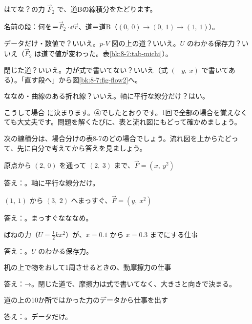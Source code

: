 はてな？の力 $\vec F_2$ で、道Bの線積分をたどります。
\begin{enumerate}[label={\bkcircled[\bkTT]{\arabic*}}, leftmargin=2.4\zw, itemsep=1pt, topsep=2pt]
\item 名前の段：何を＝$\vec F_2\cdot\dd\vec r$、道＝道B（$(0,\ 0)\to(0,\ 1)\to(1,\ 1)$）。
\item データだけ・数値で？\enspace いいえ。\enspace $p$-$V$ 図の上の道？\enspace いいえ。\enspace $U$ のわかる保存力？\enspace いいえ（$\vec F_2$ は道で値が変わった。表\ref{bk:8-7:tab-michi}）。
\item 閉じた道？\enspace いいえ。\enspace 力が式で書いてない？\enspace いいえ（式 $(-y,\ x)$ で書いてある）。\enspace 「直す段へ」から図\ref{bk:8-7:fig-flow2}へ。
\item ななめ・曲線のある折れ線？\enspace いいえ。\enspace 軸に平行な線分だけ？\enspace はい。
\end{enumerate}
こうして場合  に決まります。④でしたとおりです。1回で全部の場合を覚えなくても大丈夫です。問題を解くたびに、表と流れ図にもどって確かめましょう。

次の線積分は、場合分けの表8-7のどの場合でしょう。流れ図を上からたどって、先に自分で考えてから答えを見ましょう。
\begin{enumerate}[label={\bkcircled[\bkTT]{\arabic*}}, leftmargin=2.4\zw, itemsep=3pt, topsep=2pt]
\item 原点から $(2,\ 0)$ を通って $(2,\ 3)$ まで、$\vec F=(x,\ y^2)$\par\nobreak\noindent 答え：。軸に平行な線分だけ。
\item $(1,\ 1)$ から $(3,\ 2)$ へまっすぐ、$\vec F=(y,\ x^2)$\par\nobreak\noindent 答え：。まっすぐなななめ。
\item ばねの力（$U=\tfrac{1}{2}kx^2$）が、$x=0.1$ から $x=0.3$ までにする仕事\par\nobreak\noindent 答え：。$U$ のわかる保存力。
\item 机の上で物をおして1周させるときの、動摩擦力の仕事\par\nobreak\noindent 答え：→。閉じた道で、摩擦力は式で書いてなく、大きさと向きで決まる。
\item 道の上の10か所ではかった力のデータから仕事を出す\par\nobreak\noindent 答え：。データだけ。
\end{enumerate}

